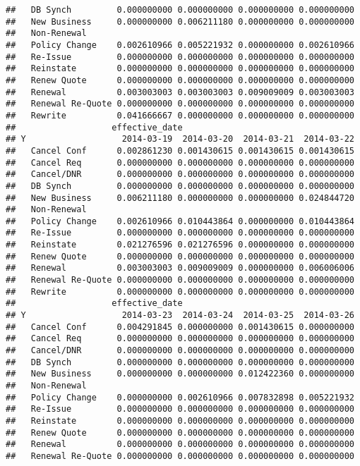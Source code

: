 \documentclass[]{article}
\begin{document}
\begin{verbatim}
##   DB Synch         0.000000000 0.000000000 0.000000000 0.000000000
##   New Business     0.000000000 0.006211180 0.000000000 0.000000000
##   Non-Renewal                                                     
##   Policy Change    0.002610966 0.005221932 0.000000000 0.002610966
##   Re-Issue         0.000000000 0.000000000 0.000000000 0.000000000
##   Reinstate        0.000000000 0.000000000 0.000000000 0.000000000
##   Renew Quote      0.000000000 0.000000000 0.000000000 0.000000000
##   Renewal          0.003003003 0.003003003 0.009009009 0.003003003
##   Renewal Re-Quote 0.000000000 0.000000000 0.000000000 0.000000000
##   Rewrite          0.041666667 0.000000000 0.000000000 0.000000000
##                   effective_date
## Y                   2014-03-19  2014-03-20  2014-03-21  2014-03-22
##   Cancel Conf      0.002861230 0.001430615 0.001430615 0.001430615
##   Cancel Req       0.000000000 0.000000000 0.000000000 0.000000000
##   Cancel/DNR       0.000000000 0.000000000 0.000000000 0.000000000
##   DB Synch         0.000000000 0.000000000 0.000000000 0.000000000
##   New Business     0.006211180 0.000000000 0.000000000 0.024844720
##   Non-Renewal                                                     
##   Policy Change    0.002610966 0.010443864 0.000000000 0.010443864
##   Re-Issue         0.000000000 0.000000000 0.000000000 0.000000000
##   Reinstate        0.021276596 0.021276596 0.000000000 0.000000000
##   Renew Quote      0.000000000 0.000000000 0.000000000 0.000000000
##   Renewal          0.003003003 0.009009009 0.000000000 0.006006006
##   Renewal Re-Quote 0.000000000 0.000000000 0.000000000 0.000000000
##   Rewrite          0.000000000 0.000000000 0.000000000 0.000000000
##                   effective_date
## Y                   2014-03-23  2014-03-24  2014-03-25  2014-03-26
##   Cancel Conf      0.004291845 0.000000000 0.001430615 0.000000000
##   Cancel Req       0.000000000 0.000000000 0.000000000 0.000000000
##   Cancel/DNR       0.000000000 0.000000000 0.000000000 0.000000000
##   DB Synch         0.000000000 0.000000000 0.000000000 0.000000000
##   New Business     0.000000000 0.000000000 0.012422360 0.000000000
##   Non-Renewal                                                     
##   Policy Change    0.000000000 0.002610966 0.007832898 0.005221932
##   Re-Issue         0.000000000 0.000000000 0.000000000 0.000000000
##   Reinstate        0.000000000 0.000000000 0.000000000 0.000000000
##   Renew Quote      0.000000000 0.000000000 0.000000000 0.000000000
##   Renewal          0.000000000 0.000000000 0.000000000 0.000000000
##   Renewal Re-Quote 0.000000000 0.000000000 0.000000000 0.000000000

\end{verbatim}
\end{document}
